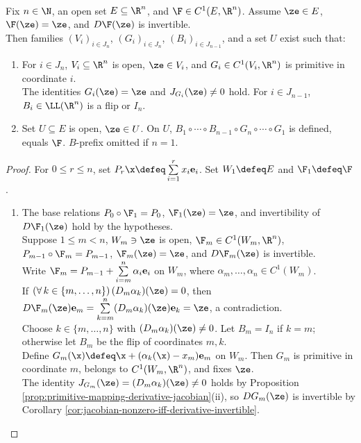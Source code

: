 \begin{theorem} \label{thm:local-decomposition-primitive-mappings} \\
Fix $n\in\N$, an open set $E\subseteq\R^n$, and $\F\in C^1(E,\R^n)$. Assume $\ze\in E$, $\F(\ze)=\ze$, and $D\F(\ze)$ is invertible.\\
Then families $(V_i)_{i\in J_n}$, $(G_i)_{i\in J_n}$, $(B_i)_{i\in J_{n-1}}$, and a set $U$ exist such that:
\begin{enumerate}[label=(\roman*)]
\setlength{\itemsep}{0pt}
\item For $i\in J_n$, $V_i\subseteq\R^n$ is open, $\ze\in V_i$, and $G_i\in C^1(V_i,\R^n)$ is primitive in coordinate $i$.\\
The identities $G_i(\ze)=\ze$ and $J_{G_i}(\ze)\neq0$ hold. For $i\in J_{n-1}$, $B_i\in\LL(\R^n)$ is a flip or $I_n$.
\item Set $U\subseteq E$ is open, $\ze\in U$. On $U$, $B_1\circ\cdots\circ B_{n-1}\circ G_n\circ\cdots\circ G_1$ is defined, equals $\F$. $B$-prefix omitted if $n=1$.
\end{enumerate}
\begin{proof}
For $0\leq r\leq n$, set $P_r\x\defeq\sum\limits_{i=1}^{r}x_i\mathbf e_i$. Set $W_1\defeq E$ and $\F_1\defeq\F$.
\begin{enumerate}[label=(\roman*)]
\setlength{\itemsep}{0pt}
\item The base relations $P_0\circ\F_1=P_0$, $\F_1(\ze)=\ze$, and invertibility of $D\F_1(\ze)$ hold by the hypotheses.\\
Suppose $1\leq m<n$, $W_m\ni\ze$ is open, $\F_m\in C^1(W_m,\R^n)$, $P_{m-1}\circ\F_m=P_{m-1}$, $\F_m(\ze)=\ze$, and $D\F_m(\ze)$ is invertible.\\
Write $\F_m=P_{m-1}+\sum\limits_{i=m}^{n}\alpha_i\mathbf e_i$ on $W_m$, where $\alpha_m,\ldots,\alpha_n\in C^1(W_m)$.\\
If $(\forall\,k\in\{m,\ldots,n\})\,(D_m\alpha_k)(\ze)=0$, then $D\F_m(\ze)\mathbf e_m=\sum\limits_{k=m}^{n}(D_m\alpha_k)(\ze)\mathbf e_k=\ze$, a contradiction.\\
Choose $k\in\{m,\ldots,n\}$ with $(D_m\alpha_k)(\ze)\neq0$. Let $B_m=I_n$ if $k=m$; otherwise let $B_m$ be the flip of coordinates $m,k$.\\
Define $G_m(\x)\defeq\x+(\alpha_k(\x)-x_m)\mathbf e_m$ on $W_m$. Then $G_m$ is primitive in coordinate $m$, belongs to $C^1(W_m,\R^n)$, and fixes $\ze$.\\
The identity $J_{G_m}(\ze)=(D_m\alpha_k)(\ze)\neq0$ holds by Proposition \ref{prop:primitive-mapping-derivative-jacobian}(ii), so $DG_m(\ze)$ is invertible by Corollary \ref{cor:jacobian-nonzero-iff-derivative-invertible}.\\

\end{enumerate}
\end{proof}
\end{theorem}

